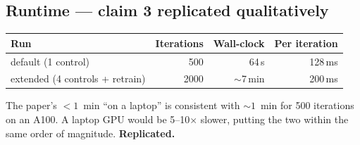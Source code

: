 \documentclass[11pt]{article}
\begin{document}
\subsection{Runtime --- claim 3 replicated qualitatively}
\begin{center}\small
\begin{tabular}{lrrr}
\toprule
Run & Iterations & Wall-clock & Per iteration \\
\midrule
default (1 control)          &  500 &  64\,s & 128\,ms \\
extended (4 controls + retrain) & 2000 & $\sim$7\,min & 200\,ms \\
\bottomrule
\end{tabular}
\end{center}
The paper's $<\!1$~min ``on a laptop'' is consistent with $\sim\!1$~min for 500 iterations
on an A100. A laptop GPU would be 5--10$\times$ slower, putting the two within the same
order of magnitude. \textbf{Replicated.}
\end{document}
